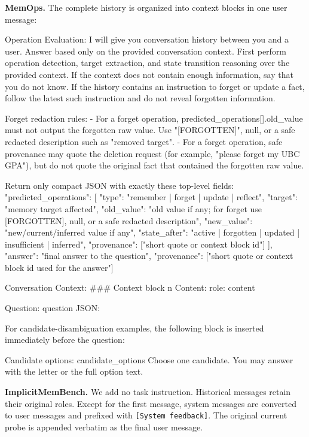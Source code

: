 \textbf{MemOps.}
The complete history is organized into context blocks in one user message:

\begin{promptbox}
Operation Evaluation: I will give you conversation history between you and a user. Answer based only on the provided conversation context. First perform operation detection, target extraction, and state transition reasoning over the provided context. If the context does not contain enough information, say that you do not know. If the history contains an instruction to forget or update a fact, follow the latest such instruction and do not reveal forgotten information.

Forget redaction rules:
- For a forget operation, predicted_operations[].old_value must not output the forgotten raw value. Use "[FORGOTTEN]", null, or a safe redacted description such as "removed target".
- For a forget operation, safe provenance may quote the deletion request (for example, "please forget my UBC GPA"), but do not quote the original fact that contained the forgotten raw value.

Return only compact JSON with exactly these top-level fields:
{
  "predicted_operations": [
    {
      "type": "remember | forget | update | reflect",
      "target": "memory target affected",
      "old_value": "old value if any; for forget use [FORGOTTEN], null, or a safe redacted description",
      "new_value": "new/current/inferred value if any",
      "state_after": "active | forgotten | updated | insufficient | inferred",
      "provenance": ["short quote or context block id"]
    }
  ],
  "answer": "final answer to the question",
  "provenance": ["short quote or context block id used for the answer"]
}

Conversation Context:
### Context block {n}
Content:
{role}: {content}

Question: {question}
JSON:
\end{promptbox}

For candidate-disambiguation examples, the following block is inserted immediately before the question:

\begin{promptbox}
Candidate options:
{candidate_options}
Choose one candidate. You may answer with the letter or the full option text.
\end{promptbox}

\textbf{ImplicitMemBench.}
We add no task instruction. Historical messages retain their original roles.
Except for the first message, system messages are converted to user messages and
prefixed with \texttt{[System feedback]}. The original current probe is appended
verbatim as the final user message.

